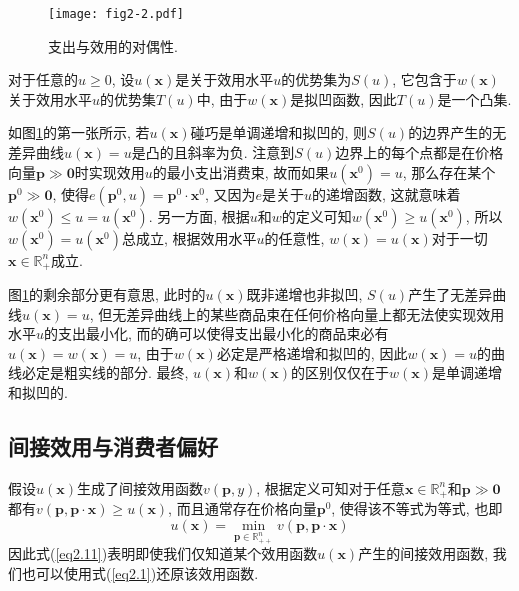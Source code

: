 \documentclass[cn, 12pt, math=mtpro2, bibstyle=apa, blue]{elegantbook}
\newcommand{\R}{\mathbb{R}}
\newcommand{\p}{\mathbf{p}}
\newcommand{\x}{\mathbf{x}}
\begin{document}
\begin{figure}[htbp!]
  \centering
  \texttt{[image: fig2-2.pdf]}
  \caption{支出与效用的对偶性.}\label{fig2.2}
\end{figure}

对于任意的$u\ge0$, 设$u(\x)$是关于效用水平$u$的优势集为$S(u)$, 它包含于$w(\x)$关于效用水平$u$的优势集$T(u)$中, 由于$w(\x)$是拟凹函数, 因此$T(u)$是一个凸集.

如图\ref{fig2.2}的第一张所示, 若$u(\x)$碰巧是单调递增和拟凹的, 则$S(u)$的边界产生的无差异曲线$u(\x)=u$是凸的且斜率为负. 注意到$S(u)$边界上的每个点都是在价格向量$\p\gg\mathbf{0}$时实现效用$u$的最小支出消费束, 故而如果$u(\x^0)=u$, 那么存在某个$\p^0\gg\mathbf{0}$, 使得$e(\p^0,u)=\p^0\cdot\x^0$, 又因为$e$是关于$u$的递增函数, 这就意味着$w(\x^0)\leq u=u(\x^0)$. 另一方面, 根据$u$和$w$的定义可知$w(\x^0)\ge u(\x^0)$, 所以$w(\x^0)=u(\x^0)$总成立, 根据效用水平$u$的任意性, $w(\x)=u(\x)$对于一切$\x\in\R_+^n$成立.

图\ref{fig2.2}的剩余部分更有意思, 此时的$u(\x)$既非递增也非拟凹, $S(u)$产生了无差异曲线$u(\x)=u$, 但无差异曲线上的某些商品束在任何价格向量上都无法使实现效用水平$u$的支出最小化, 而的确可以使得支出最小化的商品束必有$u(\x)=w(\x)=u$, 由于$w(\x)$必定是严格递增和拟凹的, 因此$w(\x)=u$的曲线必定是粗实线的部分. 最终, $u(\x)$和$w(\x)$的区别仅仅在于$w(\x)$是单调递增和拟凹的.
\subsection{间接效用与消费者偏好}
假设$u(\x)$生成了间接效用函数$v(\p,y)$, 根据定义可知对于任意$\x\in\R_+^n$和$\p\gg\mathbf{0}$都有$v(\p,\p\cdot\x)\ge u(\x)$, 而且通常存在价格向量$\p^0$, 使得该不等式为等式, 也即
\begin{equation}\label{eq2.11}
  u(\x)=\min_{\p\in\R_{++}^n}v(\p,\p\cdot\x)
\end{equation}
因此式(\ref{eq2.11})表明即使我们仅知道某个效用函数$u(\x)$产生的间接效用函数, 我们也可以使用式(\ref{eq2.1})还原该效用函数.
\end{document}
